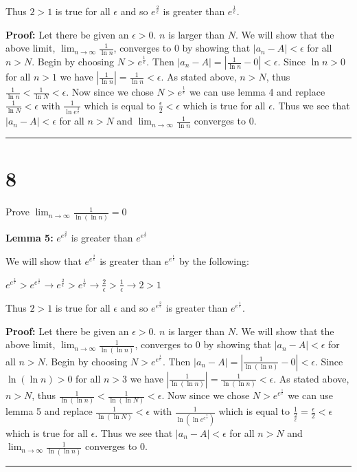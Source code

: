 \documentclass[12pt]{article}
\newcommand{\imp}{\rightarrow}
\newcommand\qedsym{\hfill \rule{2mm}{2mm}}
\begin{document}
Thus $2 > 1$ is true for all $\epsilon$ and so $e^{\frac{2}{\epsilon}}$ is greater than $e^{\frac{1}{\epsilon}}$.

\bigskip

\textbf{Proof:} Let there be given an $\epsilon > 0$. $n$ is larger than $N$. We will show that the above limit, $\lim_{n\to \infty}\frac{1}{\ln n}$, converges to $0$ by showing that $|a_n - A| < \epsilon$ for all $n > N$. Begin by choosing $N > e^{\frac{1}{\epsilon}}$. Then $|a_n - A| = | \frac{1}{\ln n} - 0 | < \epsilon$. Since $\ln n > 0$ for all $n > 1$ we have $|\frac{1}{\ln n}| = \frac{1}{\ln n} < \epsilon$. As stated above, $n > N$, thus $\frac{1}{\ln n} < \frac{1}{\ln N} < \epsilon$. Now since we chose $N > e^\frac{1}{\epsilon}$ we can use lemma 4 and replace $\frac{1}{\ln N} < \epsilon$ with $\frac{1}{\ln e^\frac{2}{\epsilon}}$ which is equal to $\frac{\epsilon}{2} < \epsilon$ which is true for all $\epsilon$. Thus we see that $|a_n - A| < \epsilon$ for all $n > N$ and $\lim_{n\to \infty}\frac{1}{\ln n}$ converges to $0$.
\qedsym{}

\section*{8}
Prove $\lim_{n\to \infty}\frac{1}{\ln(\ln n)} = 0$

\bigskip

\textbf{Lemma 5:} $e^{e^{\frac{2}{\epsilon}}}$ is greater than $e^{e^{\frac{1}{\epsilon}}}$

We will show that $e^{e^{\frac{2}{\epsilon}}}$ is greater than $e^{e^{\frac{1}{\epsilon}}}$ by the following:

$e^{e^{\frac{2}{\epsilon}}} > e^{e^{\frac{1}{\epsilon}}}
  \imp e^{\frac{2}{\epsilon}} > e^{\frac{1}{\epsilon}}
  \imp \frac{2}{\epsilon} > \frac{1}{\epsilon}
  \imp 2 > 1$

Thus $2 > 1$ is true for all $\epsilon$ and so $e^{e^{\frac{2}{\epsilon}}}$ is greater than $e^{e^{\frac{1}{\epsilon}}}$.

\bigskip

\textbf{Proof:} Let there be given an $\epsilon > 0$. $n$ is larger than $N$. We will show that the above limit, $\lim_{n\to \infty}\frac{1}{\ln(\ln n)}$, converges to $0$ by showing that $|a_n - A| < \epsilon$ for all $n > N$. Begin by choosing $N > e^{e^{\frac{1}{\epsilon}}}$. Then $|a_n - A| = | \frac{1}{\ln(\ln n)} - 0 | < \epsilon$. Since $\ln(\ln n) > 0$ for all $n > 3$ we have $|\frac{1}{\ln(\ln n)}| = \frac{1}{\ln(\ln n)} < \epsilon$. As stated above, $n > N$, thus $\frac{1}{\ln(\ln n)} < \frac{1}{\ln(\ln N)} < \epsilon$. Now since we chose $N > e^{e^\frac{1}{\epsilon}}$ we can use lemma 5 and replace $\frac{1}{\ln(\ln N)} < \epsilon$ with $\frac{1}{\ln(\ln e^{e^\frac{2}{\epsilon}})}$ which is equal to $\frac{1}{\frac{2}{\epsilon}} = \frac{\epsilon}{2} < \epsilon$ which is true for all $\epsilon$. Thus we see that $|a_n - A| < \epsilon$ for all $n > N$ and $\lim_{n\to \infty}\frac{1}{\ln(\ln n)}$ converges to $0$.
\qedsym{}
\end{document}
